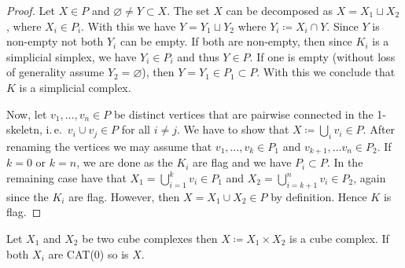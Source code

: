 \begin{proof}
  Let \(X \in P\) and \(\varnothing \neq Y \subset X\). The set \(X\) can be decomposed as \(X = X_1 \sqcup X_2\), where \(X_i \in P_i\). With this we have \(Y = Y_1 \sqcup Y_2\) where \(Y_i \coloneqq X_i \cap Y\). Since \(Y\) is non-empty not both \(Y_i\) can be empty. If both are non-empty, then since \(K_i\) is a simplicial simplex, we have \(Y_i \in P_i\) and thus \(Y \in P\). If one is empty (without loss of generality assume \(Y_2 = \varnothing\)), then \(Y = Y_1 \in P_1 \subset P\). With this we conclude that \(K\) is a simplicial complex.

  Now, let \(v_1, \dots, v_n \in P\) be distinct vertices that are pairwise connected in the 1-skeletn, i.\,e.\ \(v_i \cup v_j \in P\) for all \(i \neq j\). We have to show that \(X \coloneqq \bigcup_i v_i \in P\). After renaming the vertices we may assume that \(v_1, \dots, v_k \in P_1\) and \(v_{k+1}, \dots v_{n} \in P_2\). If \(k=0\) or \(k=n\), we are done as the \(K_i\) are flag and we have \(P_i \subset P\). In the remaining case have that \(X_1 = \bigcup_{i=1}^kv_i \in P_1\) and \(X_2 = \bigcup_{i=k+1}^n v_i \in P_2\), again since the \(K_i\) are flag. However, then \(X = X_1 \cup X_2 \in P\) by definition. Hence \(K\) is flag.
\end{proof}

\begin{prop}
  \label{prop:product-cat}
  Let \(X_1\) and \(X_2\) be two cube complexes then \(X \coloneqq X_1 \times X_2\) is a cube complex. If both \(X_i\) are CAT(0) so is \(X\).
\end{prop}

